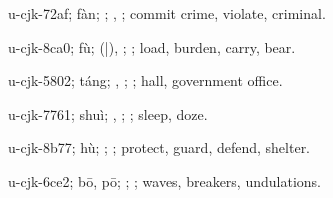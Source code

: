 \begin{multicols}{2}
{\cjkgGlue{}u-cjk-72af; fàn; \cjkgGlue{}\cjkgGlue{}\cjkgGlue{}; \cjkgGlue{}, \cjkgGlue{}; commit crime, violate, criminal.

\cjkgGlue{}u-cjk-8ca0; fù; \cjkgGlue{}\cjkgGlue{}(\cjkgGlue{}|\cjkgGlue{}), \cjkgGlue{}\cjkgGlue{}\cjkgGlue{}; \cjkgGlue{}; load, burden, carry, bear.

\cjkgGlue{}u-cjk-5802; táng; \cjkgGlue{}, \cjkgGlue{}; \cjkgGlue{}; hall, government office.

\cjkgGlue{}u-cjk-7761; shuì; \cjkgGlue{}, \cjkgGlue{}; \cjkgGlue{}; sleep, doze.

\cjkgGlue{}u-cjk-8b77; hù; \cjkgGlue{}\cjkgGlue{}\cjkgGlue{}; \cjkgGlue{}; protect, guard, defend, shelter.

\cjkgGlue{}u-cjk-6ce2; bō, pō; \cjkgGlue{}; \cjkgGlue{}; waves, breakers, undulations.

}
\end{multicols}
